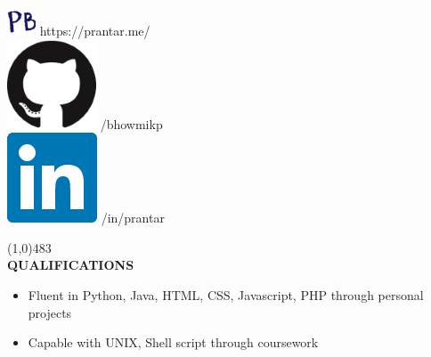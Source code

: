 \documentclass[10pt,oneside]{article}
\begin{document}
        \noindent
        \makebox[\textwidth][c]{}%
        \begin{flushright}
            \vspace*{-3.5mm}
            \includegraphics[scale=0.5]{icon}
            https://prantar.me/\\
            \includegraphics[scale=0.25]{github}
            /bhowmikp\\
            \includegraphics[scale=0.25]{linkedin}
            /in/prantar\\
        \end{flushright}
        
        \line(1,0){483}\\
        \large{\textbf{QUALIFICATIONS}}\\
        \begin{itemize}
            \item Fluent in Python, Java, HTML, CSS, Javascript, PHP through personal projects
            \item Capable with UNIX, Shell script through coursework
        \end{itemize}
        
\end{document}
